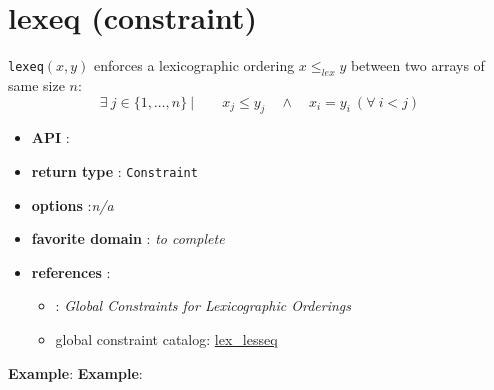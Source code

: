 \label{lexeq}
\hypertarget{lexeq}{}

\section{lexeq (constraint)}\label{lexeq:lexeqconstraint}\hypertarget{lexeq:lexeqconstraint}{}
\begin{notedef}
  \texttt{lexeq}$(x,y)$ enforces a lexicographic ordering  $x \le_{lex} y$ between two arrays of same size $n$:
$$\exists\ j\in\{1,\ldots,n\}\ |\qquad x_j\le y_j\quad \land\quad x_i=y_i\ (\forall\  i<j)$$
\end{notedef}

\begin{itemize}
	\item \textbf{API} : 
	\item \textbf{return type} : \texttt{Constraint}
	\item \textbf{options} :\emph{n/a}
	\item \textbf{favorite domain} : \emph{to complete}
	\item \textbf{references} :
      \begin{itemize}
      \item \cite{FrischCP02}: \emph{Global Constraints for Lexicographic Orderings}
      \item global constraint catalog: \href{http://www.emn.fr/x-info/sdemasse/gccat/Clex_lesseq.html}{lex\_lesseq}
      \end{itemize}
\end{itemize}

\textbf{Example}:
\textbf{Example}:
